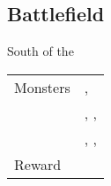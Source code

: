 \subsection{Battlefield}
\label{map:battlefield_16}

South of the 

\noindent\begin{tabularx}{\textwidth}[l]{lX}
	Monsters
	& \nameref{monster:red_cap}, \nameref{monster:red_cap} \\
	& \nameref{monster:red_cap}, \nameref{monster:red_cap}, \nameref{monster:flazzard} \\
	& \nameref{monster:flazzard}, \nameref{monster:flazzard}, \nameref{monster:flazzard}
\\ \hline
	Reward & \nameref{spell:thunder}
\end{tabularx}
